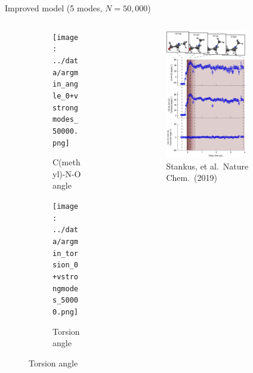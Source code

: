 \documentclass{beamer}
\begin{document}
\begin{frame}{Improved model (5 modes, $N=50{,}000$)}
\begin{columns}
\begin{column}{0.5\textwidth}
\begin{figure}
\begin{subfigure}[b]{\textwidth}
					\centering
					\texttt{[image: ../data/argmin\_angle\_0+vstrongmodes\_50000.png]}
					\caption{C(methyl)-N-O angle}
				\end{subfigure}
				\begin{subfigure}[b]{\textwidth}
					\centering
					\texttt{[image: ../data/argmin\_torsion\_0+vstrongmodes\_50000.png]}
					\caption{Torsion angle}
				\end{subfigure}
			\end{figure}
		\end{column}
		
		\begin{column}{0.5\textwidth}
			\begin{figure}[H]
				\centering
				\includegraphics[width=0.7\textwidth]{stankus_angle_plots.png}
				\caption{{\tiny Stankus, et al.\ Nature Chem.\ (2019)}}
				\label{fig:nmm-geom}
			\end{figure}
		\end{column}
	\end{columns}
	
\end{frame}
\end{document}
